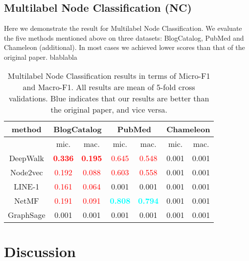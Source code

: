 \documentclass[a4paper]{article}
\begin{document}
\subsection{Multilabel Node Classification (NC)}

\noindent Here we demonstrate the result for Multilabel Node Classification. We evaluate the five methods mentioned above on three datasets: BlogCatalog, PubMed and Chameleon (additional). In most cases we achieved lower scores than that of the original paper. blablabla

\begin{table}[H]
\centering
\begin{tabular}{|c|c|c|c|c|c|c|}
\hline
method & \multicolumn{2}{|c|}{BlogCatalog}& \multicolumn{2}{|c|}{PubMed} & \multicolumn{2}{|c|}{Chameleon}\\
\hline
& mic. & mac. &mic. & mac.&mic. & mac.\\
\hline
DeepWalk& \textcolor{red}{\textbf{0.336}}& \textcolor{red}{\textbf{0.195}}&\textcolor{red}{0.645}&\textcolor{red}{0.548}&0.001&0.001\\
Node2vec& \textcolor{red}{0.192}& \textcolor{red}{0.088}&\textcolor{red}{0.603}&\textcolor{red}{0.558}&0.001&0.001\\
LINE-1& \textcolor{red}{0.161}& \textcolor{red}{0.064}&0.001&0.001&0.001&0.001\\
NetMF& \textcolor{red}{0.191}& \textcolor{red}{0.091}& \textcolor{cyan}{\textbf{0.808}}&\textcolor{cyan}{\textbf{0.794}}&0.001&0.001\\
GraphSage& 0.001& 0.001&0.001&0.001&0.001&0.001\\
\hline
\end{tabular}
\caption{Multilabel Node Classification results in terms of Micro-F1 and Macro-F1. All results are mean of 5-fold cross validations. Blue indicates that our results are better than the original paper, and vice versa.}
\end{table}


\section{Discussion}

\end{document}
